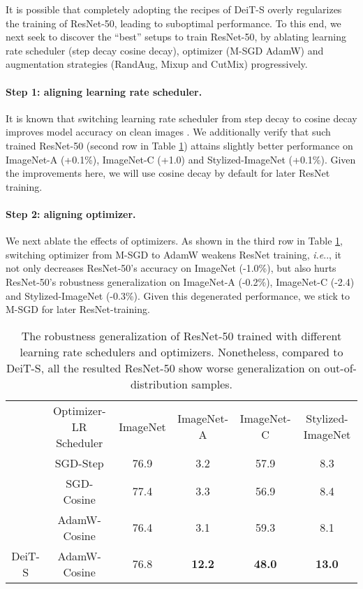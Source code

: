 \documentclass{article}
\makeatletter
\def\vs{{\bm{s}}}
\DeclareRobustCommand\onedot{\futurelet\@let@token\@onedot}
\def\@onedot{\ifx\@let@token.\else.\null\fi\xspace}
\def\ie{\emph{i.e}\onedot} \def\Ie{\emph{I.e}\onedot}
\makeatother
\begin{document}
It is possible that completely adopting the recipes of DeiT-S overly regularizes the training of ResNet-50, leading to suboptimal performance. To this end, we next seek to discover the ``best'' setups to train ResNet-50, by ablating learning rate scheduler (step decay \vs cosine decay), optimizer (M-SGD \vs AdamW) and augmentation strategies (RandAug, Mixup and CutMix) progressively.

\paragraph{Step 1: aligning learning rate scheduler.} 
It is known that switching learning rate scheduler from step decay to cosine decay improves model accuracy on clean images \cite{bello2021revisiting}. We additionally verify that such trained ResNet-50 (second row in Table \ref{tab:optimizer}) attains slightly better performance on ImageNet-A (+0.1\%), ImageNet-C (+1.0) and Stylized-ImageNet (+0.1\%). Given the improvements here, we will use cosine decay by default for later ResNet training.


\paragraph{Step 2: aligning optimizer.} 
We next ablate the effects of optimizers. As shown in the third row in Table \ref{tab:optimizer}, switching optimizer from M-SGD to AdamW weakens ResNet training, \ie, it not only decreases ResNet-50's accuracy on ImageNet (-1.0\%), but also hurts ResNet-50's robustness generalization on ImageNet-A (-0.2\%), ImageNet-C (-2.4) and Stylized-ImageNet (-0.3\%). Given this degenerated performance, we stick to M-SGD for later ResNet-training.


\begin{table}[!ht]
\caption{The robustness generalization of ResNet-50 trained with different learning rate schedulers and optimizers. Nonetheless, compared to DeiT-S, all the resulted ResNet-50 show worse generalization on out-of-distribution samples.}
\footnotesize
\centering
\begin{tabular}{c|c|c|c|c|c}
\shline
                            & Optimizer-LR Scheduler & ImageNet \textcolor{red}{}& ImageNet-A \textcolor{red}{} & ImageNet-C \textcolor{red}{}& Stylized-ImageNet \textcolor{red}{}\\ \shline \multirow{3}{*}{ResNet-50}  & SGD-Step       &   76.9        &   3.2        &    57.9       &    8.3     \\ 
                            & SGD-Cosine       &   77.4      &   3.3      &    56.9       &    8.4    \\ 
                            & AdamW-Cosine     &    76.4      &    3.1        &     59.3       &     8.1    \\ \hline 
DeiT-S & AdamW-Cosine     &  76.8        &  \textbf{12.2}         &   \textbf{48.0}        &     \textbf{13.0}     \\ \hline 
\end{tabular}
\label{tab:optimizer}
\end{table}
\end{document}
